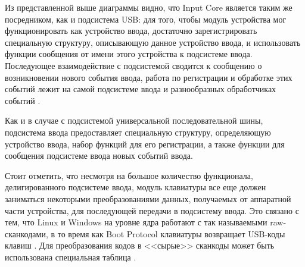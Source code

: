 Из представленной выше диаграммы видно, что Input Core является таким же посредником, как и подсистема USB: для того,
чтобы модуль устройства мог функционировать как устройство ввода, достаточно зарегистрировать специальную структуру, описывающую 
данное устройство ввода, и использовать функции сообщения от имени этого устройства к подсистеме ввода. 
Последующее взаимодействие с подсистемой сводится к сообщению о возникновении нового события ввода, 
работа по регистрации и обработке этих событий лежит на самой подсистеме ввода и разнообразных обработчиках событий \cite{inputsubsystem}.

Как и в случае с подсистемой универсальной последовательной шины, подсистема ввода предоставляет специальную структуру,
определяющую устройство ввода, набор функций для его регистрации, 
а также функции для сообщения подсистеме ввода новых событий ввода.

Стоит отметить, что несмотря на большое количество функционала, делигированного подсистеме ввода, модуль клавиатуры
все еще должен заниматься некоторыми преобразованиями данных, получаемых от аппаратной части устройства, 
для последующей передачи в подсистему ввода. 
Это связано с тем, что Linux и Windows на уровне ядра работают с так называемыми raw-сканкодами, в то время как
Boot Protocol клавиатуры возвращает USB-коды клавиш \cite{deskthority}.
Для преобразования кодов в <<сырые>> сканкоды может быть использована специальная таблица \cite{scancodes}.